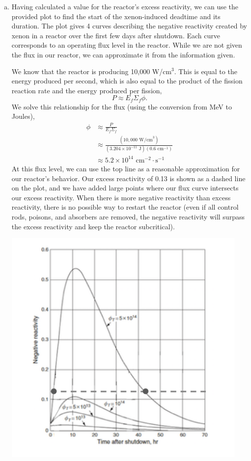 \documentclass{report}
\begin{document}
\begin{enumerate}[a)]
\item Having calculated a value for the reactor's excess reactivity, we can use the provided plot to find the start of the xenon-induced deadtime and its duration. The plot gives 4 curves describing the negative reactivity created by xenon in a reactor over the first few days after shutdown. Each curve corresponds to an operating flux level in the reactor. While we are not given the flux in our reactor, we can approximate it from the information given. 

We know that the reactor is producing 10,000 W/cm$^3$. This is equal to the energy produced per second, which is also equal to the product of the fission reaction rate and the energy produced per fission,
$$ P \approx E_f \Sigma_f \phi .$$
We solve this relationship for the flux (using the conversion from MeV to Joules),
\begin{align*}
\phi	&\approx \frac{P}{E_f \Sigma_f} \\
		&\approx \frac{\left(10,000\text{ W/cm}^3\right)}{\left(3.204\times10^{-11}\text{ J}\right)\left(0.6\text{ cm}^{-1}\right)} \\
		&\approx 5.2\times10^{14}\text{ cm}^{-2}\cdot\text{s}^{-1}
\end{align*}
At this flux level, we can use the top line as a reasonable approximation for our reactor's behavior. Our excess reactivity of 0.13 is shown as a dashed line on the plot, and we have added large points where our flux curve intersects our excess reactivity. When there is more negative reactivity than excess reactivity, there is no possible way to restart the reactor (even if all control rods, poisons, and absorbers are removed, the negative reactivity will surpass the excess reactivity and keep the reactor subcritical). 

\includegraphics[width=12cm]{xenon-deadtime-marked}


\end{enumerate}
\end{document}
